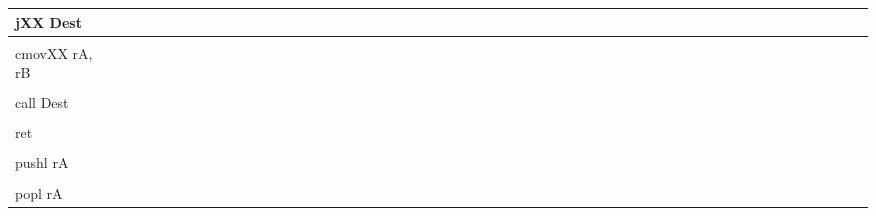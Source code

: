 \documentclass[11pt]{article}
\newcommand{\blank}{\ \ \ \ \ }
\begin{document}
\begin{center}
\begin{tabular}{|l|r|r|r|r|r|r|r|r|r|r|r|r|r|r|}
jXX Dest & \blank & \blank & \blank & \blank & \blank & \blank & \blank & \blank & \blank & \blank & \blank & \blank & \blank & \blank  \\
\hline
& & & & & & & & & & & & & & \\
cmovXX rA, rB & \blank & \blank & \blank & \blank & \blank & \blank & \blank & \blank & \blank & \blank & \blank & \blank & \blank & \blank  \\
\hline
& & & & & & & & & & & & & & \\
call Dest & \blank & \blank & \blank & \blank & \blank & \blank & \blank & \blank & \blank & \blank & \blank & \blank & \blank & \blank  \\
\hline
& & & & & & & & & & & & & & \\
ret & \blank & \blank & \blank & \blank & \blank & \blank & \blank & \blank & \blank & \blank & \blank & \blank & \blank & \blank  \\
\hline
& & & & & & & & & & & & & & \\
pushl rA & \blank & \blank & \blank & \blank & \blank & \blank & \blank & \blank & \blank & \blank & \blank & \blank & \blank & \blank  \\
\hline
& & & & & & & & & & & & & & \\
popl rA & \blank & \blank & \blank & \blank & \blank & \blank & \blank & \blank & \blank & \blank & \blank & \blank & \blank & \blank  \\
\hline
\end{tabular}
\end{center}
\end{document}
